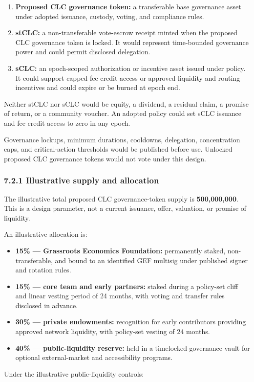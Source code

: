 \documentclass[11pt]{article}
\begin{document}
\begin{enumerate}[leftmargin=*]
\item \textbf{Proposed CLC governance token:} a transferable base governance asset under adopted issuance, custody, voting, and compliance rules.
\item \textbf{stCLC:} a non-transferable vote-escrow receipt minted when the proposed CLC governance token is locked. It would represent time-bounded governance power and could permit disclosed delegation.
\item \textbf{sCLC:} an epoch-scoped authorization or incentive asset issued under policy. It could support capped fee-credit access or approved liquidity and routing incentives and could expire or be burned at epoch end.
\end{enumerate}
Neither stCLC nor sCLC would be equity, a dividend, a residual claim, a promise of return, or a community voucher. An adopted policy could set sCLC issuance and fee-credit access to zero in any epoch.

Governance lockups, minimum durations, cooldowns, delegation, concentration caps, and critical-action thresholds would be published before use. Unlocked proposed CLC governance tokens would not vote under this design.

\subsubsection*{7.2.1 Illustrative supply and allocation}

The illustrative total proposed CLC governance-token supply is \textbf{500,000,000}. This is a design parameter, not a current issuance, offer, valuation, or promise of liquidity.

An illustrative allocation is:

\begin{itemize}[leftmargin=*]
\item \textbf{15\% --- Grassroots Economics Foundation:} permanently staked, non-transferable, and bound to an identified GEF multisig under published signer and rotation rules.
\item \textbf{15\% --- core team and early partners:} staked during a policy-set cliff and linear vesting period of 24 months, with voting and transfer rules disclosed in advance.
\item \textbf{30\% --- private endowments:} recognition for early contributors providing approved network liquidity, with policy-set vesting of 24 months.
\item \textbf{40\% --- public-liquidity reserve:} held in a timelocked governance vault for optional external-market and accessibility programs.
\end{itemize}
Under the illustrative public-liquidity controls:
\end{document}
